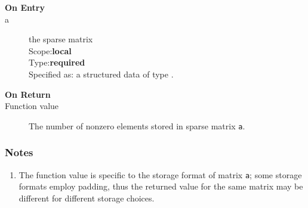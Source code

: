 \begin{description}
\item[\bf On Entry]
\item[a] the sparse matrix\\
Scope:{\bf local}\\
Type:{\bf required}\\
Specified as: a structured data of type \spdata.
\end{description}

\begin{description}
\item[\bf On Return]
\item[Function value] The number of nonzero elements stored in sparse matrix \verb|a|.
\end{description}

\subsubsection*{Notes}
\begin{enumerate}
\item The function value is specific to the storage format of matrix
  \verb|a|; some storage formats employ padding, thus the returned
  value for the same matrix may be different for different storage choices.
\end{enumerate}


